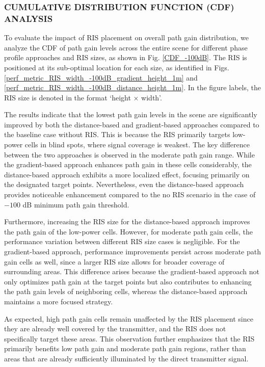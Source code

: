 \documentclass{IEEEoj}
\begin{document}
\subsubsection{CUMULATIVE DISTRIBUTION FUNCTION (CDF) ANALYSIS}
To evaluate the impact of RIS placement on overall path gain distribution, we analyze the CDF of path gain levels across the entire scene for different phase profile approaches and RIS sizes, as shown in Fig. \ref{CDF_-100dB}. The RIS is positioned at its sub-optimal location for each size, as identified in Figs. \ref{perf_metric_RIS_width_-100dB_gradient_height_1m} and \ref{perf_metric_RIS_width_-100dB_distance_height_1m}. In the figure labels, the RIS size is denoted in the format `height × width'.

The results indicate that the lowest path gain levels in the scene are significantly improved by both the distance-based and gradient-based approaches compared to the baseline case without RIS. This is because the RIS primarily targets low-power cells in blind spots, where signal coverage is weakest. The key difference between the two approaches is observed in the moderate path gain range. While the gradient-based approach enhances path gain in these cells considerably, the distance-based approach exhibits a more localized effect, focusing primarily on the designated target points. Nevertheless, even the distance-based approach provides noticeable enhancement compared to the no RIS scenario in the case of $-100$ dB minimum path gain threshold.

Furthermore, increasing the RIS size for the distance-based approach improves the path gain of the low-power cells. However, for moderate path gain cells, the performance variation between different RIS size cases is negligible. For the gradient-based approach, performance improvements persist across moderate path gain cells as well, since a larger RIS size allows for broader coverage of surrounding areas. This difference arises because the gradient-based approach not only optimizes path gain at the target points but also contributes to enhancing the path gain levels of neighboring cells, whereas the distance-based approach maintains a more focused strategy.

As expected, high path gain cells remain unaffected by the RIS placement since they are already well covered by the transmitter, and the RIS does not specifically target these areas. This observation further emphasizes that the RIS primarily benefits low path gain and moderate path gain regions, rather than areas that are already sufficiently illuminated by the direct transmitter signal.
\end{document}
